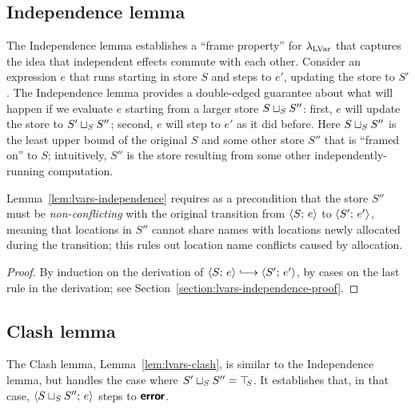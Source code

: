 \subsection{Independence lemma}\label{subsection:lvars-independence}

The Independence lemma establishes a ``frame property'' for
$\lambda_{\textrm{LVar}}$ that captures the idea that independent effects commute
with each other.  Consider an expression $e$ that runs starting in
store $S$ and steps to $e'$, updating the store to $S'$.  The
Independence lemma provides a double-edged guarantee about what will
happen if we evaluate $e$ starting from a larger store
$S \sqcup_{S} S''$: first, $e$ will update the store to
$S' \sqcup_{S} S''$; second, $e$ will step to $e'$ as it did before.
Here $S \sqcup_{S} S''$ is the least upper bound of the original $S$
and some other store $S''$ that is ``framed on'' to $S$; intuitively,
$S''$ is the store resulting from some other independently-running
computation.

Lemma~\ref{lem:lvars-independence} requires as a precondition that the
store $S''$ must be \emph{non-conflicting} with the original
transition from $\langle S;\, e \rangle$ to $\langle S';\, e' \rangle$, meaning that
locations in $S''$ cannot share names with locations newly allocated
during the transition; this rules out location name conflicts caused
by allocation.

\LVarsDefNonConflicting

\LVarsLemIndependence
\begin{proof}
  By induction on the derivation of $\config{S}{e} \parstepsto
  \config{S'}{e'}$, by cases on the last rule in the derivation; see
  Section~\ref{section:lvars-independence-proof}.
\end{proof}

\subsection{Clash lemma}

The Clash lemma, Lemma~\ref{lem:lvars-clash}, is similar to the
Independence lemma, but handles the case where $S' \sqcup_{S} S'' =
\top\hspace{-0.85mm}_{S}$.  It establishes that, in that case,
$\langle S \sqcup_{S} S'';\, e \rangle$ steps to $\textbf{\textsf{error}}$.


